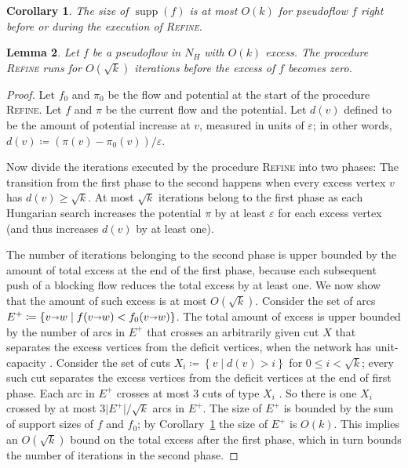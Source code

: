 \documentclass[11pt]{article}
\makeatletter
\def\etal{\textit{et~al.}}
\def\eps{\varepsilon}
\def\abs#1{\mathopen| #1 \mathclose|}		%
\def\Set#1{\left\{ #1 \right\}}
\def\arcto{\mathord\shortrightarrow}
\def\arc#1#2{#1\arcto#2}
\def\supp{\operatorname{supp}}
\theoremstyle{plain}
\newtheorem{lemma}{Lemma}[section]
\newtheorem{corollary}[lemma]{Corollary}
\numberwithin{figure}{section}
\def\EMPH#1{\textbf{\boldmath #1}}
\def\n@te#1{\textsf{\boldmath \textbf{$\langle\!\langle$#1$\rangle\!\rangle$}}\leavevmode}
\def\note#1{\textcolor{red}{\n@te{#1}}}
\makeatother
\begin{document}
\begin{corollary}
\label{corollary:support_size_during}
The size of $\supp(f)$ is at most $O(k)$ for pseudoflow $f$ right before or during the execution of \textsc{Refine}.
\end{corollary}


\begin{lemma}
\label{lemma:goldberg_refine_iterations}
Let $f$ be a pseudoflow in $N_H$ with $O(k)$ excess.
The procedure \textsc{Refine} runs for $O(\sqrt{k})$ iterations
before the excess of $f$ becomes zero.
\end{lemma}

\begin{proof}
Let $f_0$ and $\pi_0$ be the flow and potential at the start of the procedure \textsc{Refine}.  Let $f$ and $\pi$ be the current flow and the potential.
Let \EMPH{$d(v)$} defined to be the amount of potential increase at $v$, measured in units of $\eps$; in other words, $d(v) \coloneqq (\pi(v) - \pi_0(v)) / \eps$.
%

Now divide the iterations executed by
the procedure \textsc{Refine}
into two phases:  The transition from the first phase to the second happens when every excess vertex $v$ has $d(v) \ge \sqrt{k}$.
%
At most $\sqrt{k}$ iterations belong to
the first phase as each Hungarian search increases the potential $\pi$ by at least $\eps$ for each excess vertex (and thus increases $d(v)$ by at least one).

The number of iterations
belonging to the second phase is upper bounded by the amount of total excess at the end of the first phase, because each subsequent push of a blocking flow reduces the total excess by at least one.  We now show that the amount of such excess is at most $O(\sqrt{k})$.
%
Consider the set of arcs $E^+ \coloneqq \Set{\arc vw \mid f(\arc vw) < f_0(\arc vw)}$.
The total amount of excess is upper bounded by the number of arcs in $E^+$ that crosses an arbitrarily given cut $X$ that separates the excess vertices from the deficit vertices, when the network has unit-capacity \cite[Lemma~3.6]{GHKT17}.
%
Consider the set of cuts $X_i \coloneqq \Set{v \mid d(v) > i}$ for $0 \le i < \sqrt{k}$; every such cut separates the excess vertices from the deficit vertices at the end of first phase.
Each arc in $E^+$ crosses at most $3$ cuts of type $X_i$ \cite[Lemma~3.1]{GHKT17}.  So there is one $X_i$ crossed by at most $3\abs{E^+}/\sqrt{k}$ arcs in $E^+$.
%
The size of $E^+$ is bounded by the sum of support sizes of $f$ and $f_0$; by Corollary~\ref{corollary:support_size_during} the size of $E^+$ is $O(k)$.
This implies an $O(\sqrt{k})$ bound on the total excess after the first phase, which in turn bounds the number of iterations in the second phase.
\end{proof}
\end{document}
